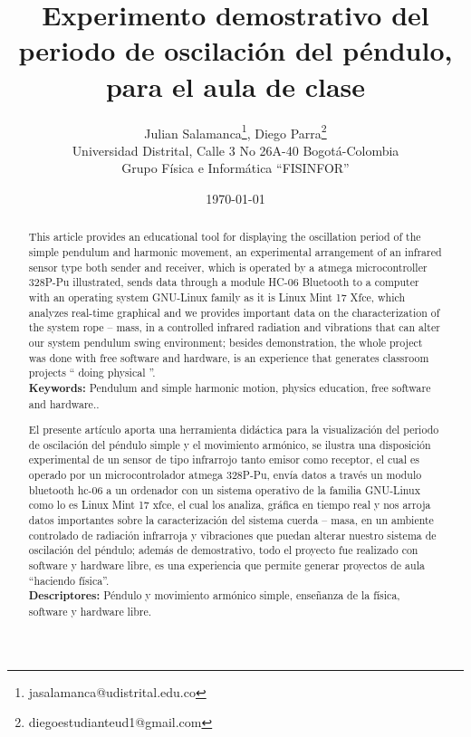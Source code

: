 \documentclass[12pt]{article}
\title{\bf{Experimento demostrativo del periodo de oscilación del péndulo, para el aula de clase}}
\author{Julian Salamanca\footnote{jasalamanca@udistrital.edu.co}, Diego Parra\footnote{diegoestudianteud1@gmail.com} \\
  Universidad Distrital, Calle 3 No 26A-40 Bogotá-Colombia\\
  Grupo Física e Informática ``FISINFOR''
}
\date{\today}
\def\tablename{Tabla}%
\begin{document}
\renewcommand{\tablename}{Tabla}
\maketitle
\vspace{-0.8cm}

\begin{abstract}
This article provides an educational tool for displaying the oscillation period of the simple pendulum and harmonic movement, an experimental arrangement of an infrared sensor type both sender and receiver, which is operated by a atmega microcontroller 328P-Pu illustrated, sends data through a module HC-06 Bluetooth to a computer with an operating system GNU-Linux family as it is Linux Mint 17 Xfce, which analyzes real-time graphical and we provides important data on the characterization of the system rope – mass, in a controlled infrared radiation and vibrations that can alter our system pendulum swing environment; besides demonstration, the whole project was done with free software and hardware, is an experience that generates classroom projects `` doing physical ''.\\

{\bf{Keywords:}} Pendulum and simple harmonic motion, physics education, free software and hardware..
\end{abstract}
\begin{abstract}

El presente artículo aporta una herramienta didáctica para la visualización del periodo de oscilación del péndulo  simple y el movimiento armónico,  se ilustra una disposición experimental de un sensor de tipo infrarrojo  tanto emisor como receptor,  el cual es operado por un microcontrolador atmega 328P-Pu, envía datos a través  un modulo bluetooth hc-06 a un ordenador con un sistema operativo de la familia GNU-Linux como lo es Linux Mint 17 xfce, el cual los analiza, gráfica en tiempo real  y nos arroja  datos importantes sobre la caracterización del sistema cuerda – masa, en un ambiente controlado de radiación infrarroja y vibraciones que puedan alterar nuestro sistema de  oscilación del péndulo; además de demostrativo, todo el proyecto fue realizado con software y hardware libre, es una experiencia que permite generar proyectos de aula ``haciendo física''.\\

{\bf{Descriptores:}} Péndulo y movimiento armónico simple, enseñanza de la física, software y hardware libre.
\end{abstract}
\end{document}

